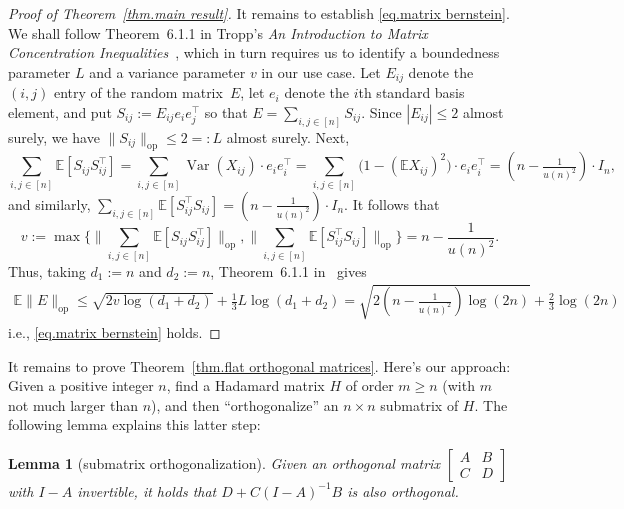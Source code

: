 \documentclass[11pt]{article}
\theoremstyle{plain}
\newtheorem{lemma}[theorem]{Lemma}
\theoremstyle{definition}
\begin{document}
\begin{proof}[Proof of Theorem~\ref{thm.main result}]
It remains to establish \eqref{eq.matrix bernstein}.
We shall follow Theorem~6.1.1 in Tropp's \textit{An Introduction to Matrix Concentration Inequalities}~\cite{Tropp:15}, which in turn requires us to identify a boundedness parameter $L$ and a variance parameter $v$ in our use case.
Let $E_{ij}$ denote the $(i,j)$ entry of the random matrix~$E$, let $e_i$ denote the $i$th standard basis element, and put $S_{ij}:=E_{ij}e_ie_j^\top$ so that $E=\sum_{i,j\in[n]}S_{ij}$.
Since $|E_{ij}|\leq 2$ almost surely, we have $\|S_{ij}\|_{\operatorname{op}}\leq 2=:L$ almost surely.
Next,
\[
\sum_{i,j\in[n]}\mathbb{E}[S_{ij}S_{ij}^\top]
=\sum_{i,j\in[n]}\operatorname{Var}(X_{ij})\cdot e_ie_i^\top
=\sum_{i,j\in[n]}\big(1-(\mathbb{E}X_{ij})^2\big)\cdot e_ie_i^\top
=(n-\tfrac{1}{u(n)^2}) \cdot I_n,
\]
and similarly, $\sum_{i,j\in[n]}\mathbb{E}[S_{ij}^\top S_{ij}]=(n-\tfrac{1}{u(n)^2}) \cdot I_n$.
It follows that
\[
v
:=\max\bigg\{\bigg\|\sum_{i,j\in[n]}\mathbb{E}[S_{ij}S_{ij}^\top]\bigg\|_{\operatorname{op}},\bigg\|\sum_{i,j\in[n]}\mathbb{E}[S_{ij}^\top S_{ij}]\bigg\|_{\operatorname{op}}\bigg\}
=n-\frac{1}{u(n)^2}.
\]
Thus, taking $d_1:=n$ and $d_2:=n$, Theorem~6.1.1 in~\cite{Tropp:15} gives
\begin{align*}
\mathbb{E}\|E\|_{\operatorname{op}}
\leq \sqrt{2v\log(d_1 + d_2)}+\tfrac{1}{3} L \log(d_1 +d_2)
=\sqrt{2(n-\tfrac{1}{u(n)^2})\log(2n)}+\tfrac{2}{3}\log(2n)
\end{align*}
i.e., \eqref{eq.matrix bernstein} holds.
\end{proof}

It remains to prove Theorem~\ref{thm.flat orthogonal matrices}.
Here's our approach:
Given a positive integer $n$, find a Hadamard matrix $H$ of order $m\geq n$ (with $m$ not much larger than $n$), and then ``orthogonalize'' an $n\times n$ submatrix of $H$.
The following lemma explains this latter step:

\begin{lemma}[submatrix orthogonalization]
\label{lem.submatrix orthogonalization}
Given an orthogonal matrix $\left[\begin{smallmatrix} A & B \\ C & D \end{smallmatrix}\right]$ with $I-A$ invertible, it holds that $D+C(I-A)^{-1}B$ is also orthogonal.
\end{lemma}
\end{document}
